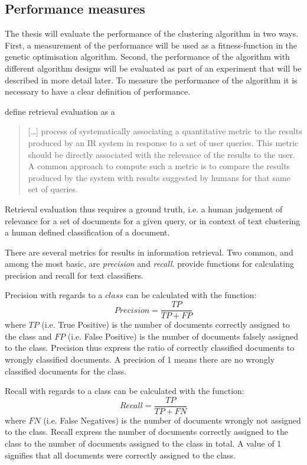 \subsection{Performance measures}
The thesis will evaluate the performance of the clustering algorithm in two ways. First, a measurement of the performance will be used as a fitness-function in the genetic optimisation algorithm. Second, the performance of the \CTC algorithm with different algorithm designs will be evaluated as part of an experiment that will be described in more detail later. To measure the performance of the \CTC algorithm it is necessary to have a clear definition of performance.

\cite[][131]{Baeza-Yates2011b} define retrieval evaluation as a \begin{quote} 
[\dots] process of systematically associating a quantitative metric to the results produced by an IR system in response to a set of user queries. This metric should be directly associated with the relevance of the results to the user. A common approach to compute such a metric is to compare the results produced by the system with results suggested by humans for that same set of queries.
\end{quote}
Retrieval evaluation thus requires a ground truth, i.e. a human judgement of relevance for a set of documents for a given query, or in context of text clustering a human defined classification of a document.

There are several metrics for results in information retrieval. Two common, and among the most basic, are \textit{precision} and \textit{recall}. \cite{Sebastiani2002,Baeza-Yates2011a} provide functions for calculating precision and recall for text classifiers.

Precision with regards to a \(class\) can be calculated with the function:
\begin{displaymath}
Precision = 
\frac{TP}{TP + FP}
\end{displaymath}
where \(TP\) (i.e. True Positive) is the number of documents correctly assigned to the class and \(FP\) (i.e. False Positive) is the number of documents falsely assigned to the class. Precision thus express the ratio of correctly classified documents to wrongly classified documents. A precision of 1 means there are no wrongly classified documents for the class.

Recall with regards to a class can be calculated with the function: 
\begin{displaymath}
Recall = 
\frac{TP}{TP + FN}
\end{displaymath}
where \(FN\) (i.e. False Negatives) is the number of documents wrongly not assigned to the class. Recall express the number of documents correctly assigned to the class to the number of documents assigned to the class in total. A value of 1 signifies that all documents were correctly assigned to the class.

